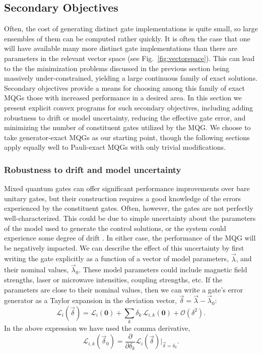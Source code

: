 \documentclass[aps,nofootinbib,pra,notitlepage,twocolumn]{revtex4-1}
\newcommand{\order}[1]{\mathcal{O}\left( #1 \right)}
\newcommand{\genmat}{\ensuremath{{\mathcal{L}}}}
\newcommand{\0}{\ensuremath{\mathbf{0}}}
\begin{document}
\subsection{Secondary Objectives}
\noindent 
Often, the cost of generating distinct gate implementations is quite small, so large ensembles of them can be computed rather quickly. It is often the case that one will have available many more distinct gate implementations than there are parameters in the relevant vector space (see Fig.~\ref{fig:vectorspace}). This can lead to the the minimization problems discussed in the previous section being massively under-constrained, yielding a large continuous family of exact solutions. Secondary objectives provide a means for choosing among this family of exact MQGs those with increased performance in a desired area. In this section we present explicit convex programs for such secondary objectives, including adding robustness to drift or model uncertainty, reducing the effective gate error, and minimizing the number of constituent gates utilized by the MQG. We choose to take generator-exact MQGs as our starting point, though the following sections apply equally well to Pauli-exact MQGs with only trivial modifications. 

\subsubsection{Robustness to drift and model uncertainty} %
\label{sub:adding_robustness}
\noindent 
Mixed quantum gates can offer significant performance improvements over bare unitary gates, but their construction requires a good knowledge of the errors experienced by the constituent gates. Often, however, the gates are not perfectly well-characterized. This could be due to simple uncertainty about the parameters of the model used to generate the control solutions, or the system could experience some degree of drift \cite{1907.13608}. In either case, the performance of the MQG will be negatively impacted. We can describe the effect of this uncertainty by first writing the gate explicitly as a function of a vector of model parameters, $\vec\lambda$, and their nominal values, $\vec\lambda_0$. These model parameters could include magnetic field strengths, laser or microwave intensities, coupling strengths, etc. If the parameters are close to their nominal values, then we can write a gate's error generator as a Taylor expansion in the deviation vector, $\vec\delta = \vec\lambda-\vec\lambda_0$:
\begin{equation}
	\label{eq:sensitivity_expansion}
	\genmat_i(\vec \delta) = \genmat_i(\0) + \sum_k \delta_k \,\genmat_{i,k}(\0) + \order{\delta^2}.
\end{equation} 
In the above expression we have used the comma derivative, 
\begin{equation}
	\genmat_{i,k}(\vec \delta_0) = \frac{\partial}{\partial \delta_k} \genmat_i(\vec\delta) \vert_{\vec \delta=\delta_0}.
\end{equation}
\end{document}
